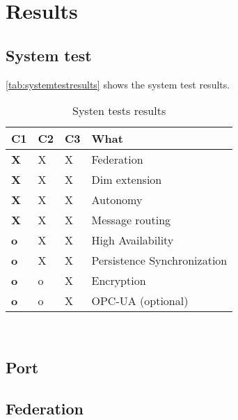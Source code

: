 \chapter{Results}\label{ch:res}

\section{System test}
\autoref{tab:systemtestresults} shows the system test results.
\begin{table}[H]
  \centering
  \scriptsize
  \begin{tabular}{|p{5mm}|p{5mm}|p{5mm}|p{20mm}|}
    \hline 	\bf C1 & C2 & C3 & What \\ \hline
	\bf \color{green!50}X & \color{green!50}X & \color{green!50}X & Federation \\ \hline
	\bf \color{green!50}X & \color{green!50}X & \color{green!50}X & Dim extension \\ \hline
	\bf \color{green!50}X & \color{green!50}X & \color{green!50}X & Autonomy \\ \hline
	\bf \color{green!50}X & \color{green!50}X & \color{green!50}X & Message routing \\ \hline
	\bf \color{red!50}o & \color{green!50}X & \color{green!50}X & High Availability \\ \hline
	\bf \color{red!50}o & \color{green!50}X & \color{green!50}X & Persistence Synchronization \\ \hline
	\bf \color{red!50}o & \color{red!50}o & \color{green!50}X & Encryption \\ \hline
	\bf \color{red!50}o & \color{red!50}o & \color{green!50}X & OPC-UA (optional) \\ \hline
  \end{tabular} \\
  \caption{Systen tests results}
  \label{tab:systemtestresults}
\end{table}

\section{Port}\label{sec:res:port}


\section{Federation}\label{sec:res:cluster}

